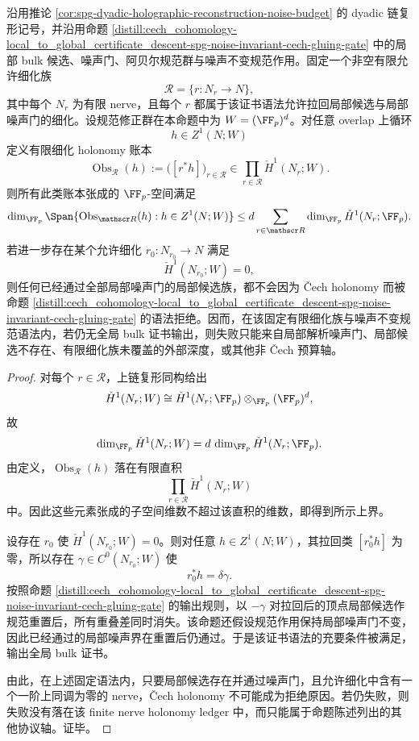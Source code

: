 \begin{proposition}\label{distill:cech_cohomology-finite_nerve_obstruction_bounds-spg-refinement-rank-ceiling}
沿用推论 \ref{cor:spg-dyadic-holographic-reconstruction-noise-budget} 的 dyadic 链复形记号，并沿用命题 \ref{distill:cech_cohomology-local_to_global_certificate_descent-spg-noise-invariant-cech-gluing-gate} 中的局部 bulk 候选、噪声门、阿贝尔规范群与噪声不变规范作用。固定一个非空有限允许细化族
\[
\mathscr R=\{r:N_r\to N\},
\]
其中每个 \(N_r\) 为有限 nerve，且每个 \(r\) 都属于该证书语法允许拉回局部候选与局部噪声门的细化。设规范修正群在本命题中为 \(W=(\FF_p)^d\)。对任意 overlap 上循环
\[
h\in Z^1(N;W)
\]
定义有限细化 holonomy 账本
\[
\operatorname{Obs}_{\mathscr R}(h)
:=\bigl([r^\ast h]\bigr)_{r\in\mathscr R}
\in \prod_{r\in\mathscr R}\check H^1(N_r;W).
\]
则所有此类账本张成的 \(\FF_p\)-空间满足
\[
\dim_{\FF_p}\Span\{\operatorname{Obs}_{\mathscr R}(h):h\in Z^1(N;W)\}
\le
 d\sum_{r\in\mathscr R}\dim_{\FF_p}\check H^1(N_r;\FF_p).
\]
若进一步存在某个允许细化 \(r_0:N_{r_0}\to N\) 满足
\[
\check H^1(N_{r_0};W)=0,
\]
则任何已经通过全部局部噪声门的局部候选族，都不会因为 \v Cech holonomy 而被命题 \ref{distill:cech_cohomology-local_to_global_certificate_descent-spg-noise-invariant-cech-gluing-gate} 的语法拒绝。因而，在该固定有限细化族与噪声不变规范语法内，若仍无全局 bulk 证书输出，则失败只能来自局部解析噪声门、局部候选不存在、有限细化族未覆盖的外部深度，或其他非 \v Cech 预算轴。
\end{proposition}
\begin{proof}
对每个 \(r\in\mathscr R\)，上链复形同构给出
\[
\check H^1(N_r;W)\cong \check H^1(N_r;\FF_p)\otimes_{\FF_p}(\FF_p)^d,
\]
故
\[
\dim_{\FF_p}\check H^1(N_r;W)=d\,\dim_{\FF_p}\check H^1(N_r;\FF_p).
\]
由定义，\(\operatorname{Obs}_{\mathscr R}(h)\) 落在有限直积
\[
\prod_{r\in\mathscr R}\check H^1(N_r;W)
\]
中。因此这些元素张成的子空间维数不超过该直积的维数，即得到所示上界。

设存在 \(r_0\) 使 \(\check H^1(N_{r_0};W)=0\)。则对任意 \(h\in Z^1(N;W)\)，其拉回类 \([r_0^\ast h]\) 为零，所以存在 \(\gamma\in C^0(N_{r_0};W)\) 使
\[
r_0^\ast h=\delta\gamma.
\]
按照命题 \ref{distill:cech_cohomology-local_to_global_certificate_descent-spg-noise-invariant-cech-gluing-gate} 的输出规则，以 \(-\gamma\) 对拉回后的顶点局部候选作规范重置后，所有重叠差同时消失。该命题还假设规范作用保持局部噪声门不变，因此已经通过的局部噪声界在重置后仍通过。于是该证书语法的充要条件被满足，输出全局 bulk 证书。

由此，在上述固定语法内，只要局部候选存在并通过噪声门，且允许细化中含有一个一阶上同调为零的 nerve，\v Cech holonomy 不可能成为拒绝原因。若仍失败，则失败没有落在该 finite nerve holonomy ledger 中，而只能属于命题陈述列出的其他协议轴。证毕。
\end{proof}
